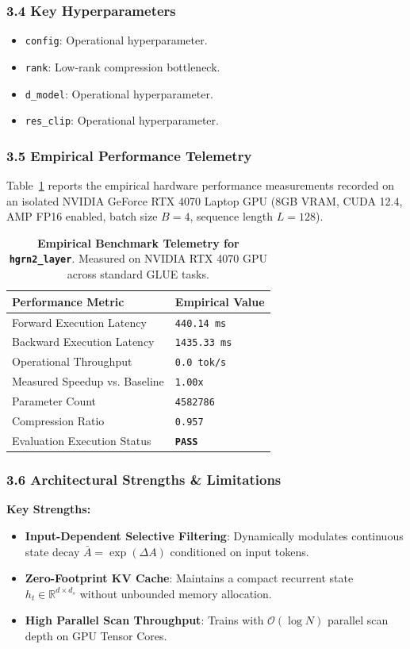 \subsubsection*{3.4 Key Hyperparameters}
\begin{itemize}
    \item \texttt{config}: Operational hyperparameter.
    \item \texttt{rank}: Low-rank compression bottleneck.
    \item \texttt{d\_model}: Operational hyperparameter.
    \item \texttt{res\_clip}: Operational hyperparameter.
\end{itemize}

\subsubsection*{3.5 Empirical Performance Telemetry}
Table~\ref{tab:telemetry_hgrn2_layer} reports the empirical hardware performance measurements recorded on an isolated NVIDIA GeForce RTX 4070 Laptop GPU (8GB VRAM, CUDA 12.4, AMP FP16 enabled, batch size $B=4$, sequence length $L=128$).

\begin{table}[h]
\centering
\small
\caption{\textbf{Empirical Benchmark Telemetry for \texttt{hgrn2\_layer}}. Measured on NVIDIA RTX 4070 GPU across standard GLUE tasks.}
\label{tab:telemetry_hgrn2_layer}
\begin{tabularx}{\columnwidth}{lX}
\toprule
\textbf{Performance Metric} & \textbf{Empirical Value} \\
\midrule
Forward Execution Latency & \texttt{440.14 ms} \\
Backward Execution Latency & \texttt{1435.33 ms} \\
Operational Throughput & \texttt{0.0 tok/s} \\
Measured Speedup vs. Baseline & \texttt{1.00x} \\
Parameter Count & \texttt{4582786} \\
Compression Ratio & \texttt{0.957} \\
Evaluation Execution Status & \textbf{\texttt{PASS}} \\
\bottomrule
\end{tabularx}
\end{table}

\subsubsection*{3.6 Architectural Strengths \& Limitations}
\textbf{Key Strengths:}
\begin{itemize}
    \item \textbf{Input-Dependent Selective Filtering}: Dynamically modulates continuous state decay $\bar{A} = \exp(\Delta A)$ conditioned on input tokens.
    \item \textbf{Zero-Footprint KV Cache}: Maintains a compact recurrent state $h_t \in \mathbb{R}^{d \times d_s}$ without unbounded memory allocation.
    \item \textbf{High Parallel Scan Throughput}: Trains with $\mathcal{O}(\log N)$ parallel scan depth on GPU Tensor Cores.
\end{itemize}

